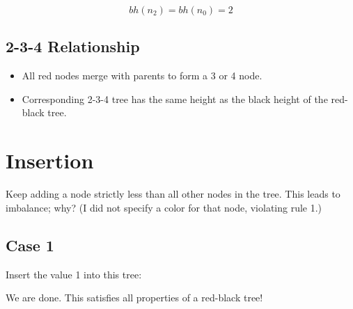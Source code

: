 \documentclass{article}
\begin{document}
\begin{equation*}
bh(n_2) = bh(n_0) = 2
\end{equation*}

\subsection{2-3-4 Relationship}

\begin{itemize}
\item All red nodes merge with parents to form a 3 or 4 node.
\item Corresponding 2-3-4 tree has the same height as the black height of the
red-black tree.
\end{itemize}

\section{Insertion}

Keep adding a node strictly less than all other nodes in the tree.  This leads
to imbalance; why?  (I did not specify a color for that node, violating rule
1.)

\subsection{Case 1}

\begin{center}
\end{center}

Insert the value 1 into this tree:

\begin{center}
\end{center}

We are done.  This satisfies all properties of a red-black tree!
\end{document}
